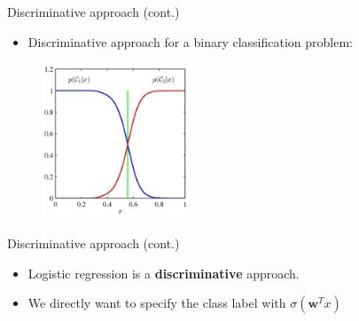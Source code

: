 \documentclass[serif, aspectratio=169]{beamer}
\begin{document}
    \begin{frame}{Discriminative approach (cont.)}
        \begin{itemize}
            \item Discriminative approach for a binary classification problem:
        \end{itemize}
        \begin{figure}[h]
            \centering
            \includegraphics[width=0.4\textwidth]{pic/Disc.png}
        \end{figure}
        \vfill
    \end{frame}
    \begin{frame}{Discriminative approach (cont.)}
        \begin{itemize}
            \item Logistic regression is a \textbf{discriminative} approach.
            \item We directly want to specify the class label with $\sigma (\mathbf{w}^T x)$
        \end{itemize}
    \end{frame}
\end{document}
